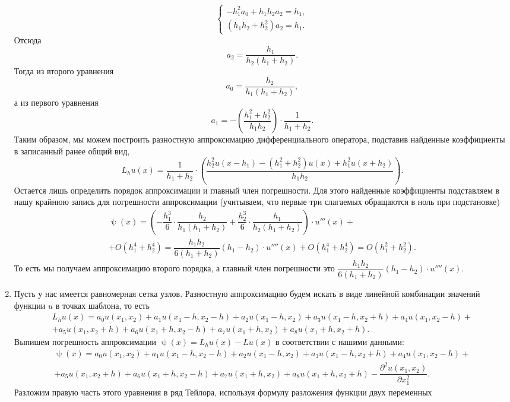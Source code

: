 \documentclass[a4paper, 12pt]{article}
\renewcommand{\psi}{\uppsi}
\renewcommand{\d}{\partial}
\begin{document}
\begin{enumerate}
$$\begin{cases}
		-h_1^2 a_{0}+ h_1h_2 a_2= h_1,\\
		(h_1h_2 + h_2^2)a_2 = h_1.
	\end{cases}$$
	Отсюда $$a_2 = \dfrac{h_1}{h_2 (h_1+h_2)}.$$
	Тогда из второго уравнения $$a_{0} = \dfrac{h_2}{h_1 (h_1+h_2)},$$ а из первого уравнения $$a_1 = -\left(\dfrac{h_1^2+h_2^2}{h_1h_2}\right)\cdot \dfrac{1}{h_1+h_2}.$$
	Таким образом, мы можем построить разностную аппроксимацию дифференциального оператора, подставив найденные коэффициенты в записанный ранее общий вид,
	$$L_h u(x) = \dfrac{1}{h_1+h_2}\cdot\left(\dfrac{h_2^2 u(x-h_1) -(h_1^2+h_2^2)u(x) + h_1^2u(x+h_2)}{h_1h_2}\right).$$ 
	Остается лишь определить порядок аппроксимации и главный член погрешности. Для этого найденные коэффициенты подставляем в нашу крайнюю запись для погрешности аппроксимации (учитываем, что первые три слагаемых обращаются в ноль при подстановке)
	\begin{multline*}
		\psi(x) = \left(-\dfrac{h_1^3}{6}\cdot \dfrac{h_2}{h_1 (h_1+h_2)} +\dfrac{h_2^3}{6} \cdot \dfrac{h_1}{h_2 (h_1+h_2)}\right)\cdot u'''(x) +\\+O(h_1^4+h_2^4) = \dfrac{h_1h_2}{6(h_1+h_2)}(h_1-h_2)\cdot u''''(x) + O(h_1^4+h_2^4) = O(h_1^2+h_2^2).
	\end{multline*}
	То есть мы получаем аппроксимацию второго порядка, а главный член погрешности это $\dfrac{h_1h_2}{6(h_1+h_2)}(h_1-h_2)\cdot u''''(x)$.
	\newpage
	\item 
	\hypertarget{t4}{}
	Пусть у нас имеется равномерная сетка узлов.
	Разностную аппроксимацию будем искать в виде линейной комбинации значений функции $u$ в точках шаблона, то есть \begin{multline*}
		L_h u(x) = a_0 u(x_1, x_2) + a_1 u(x_1-h, x_2-h) + a_2 u(x_1-h, x_2) + a_3u(x_1-h, x_2 + h) + a_4 u(x_1, x_2-h) + \\+ a_5 u (x_1, x_2+h) + a_6 u(x_1 + h, x_2 - h) + a_7 u(x_1+h, x_2) + a_8u(x_1 + h, x_2+h).
	\end{multline*} Выпишем погрешность аппроксимации $\psi(x) = L_h u(x) - L u(x)$ в соответствии с нашими данными: 
	\begin{multline*}
		\psi(x) = a_0 u(x_1, x_2) + a_1 u(x_1-h, x_2-h) + a_2 u(x_1-h, x_2) + a_3u(x_1-h, x_2 + h) + a_4 u(x_1, x_2-h) + \\+ a_5 u (x_1, x_2+h) + a_6 u(x_1 + h, x_2 - h) + a_7 u(x_1+h, x_2) + a_8u(x_1 + h, x_2+h) - \dfrac{\d^2 u(x_1, x_2)}{\d x_1^2}.
	\end{multline*}
	Разложим правую часть этого уравнения в ряд Тейлора, используя формулу разложения функции двух переменных \begin{multline*}

\end{multline*}
\end{enumerate}
\end{document}
